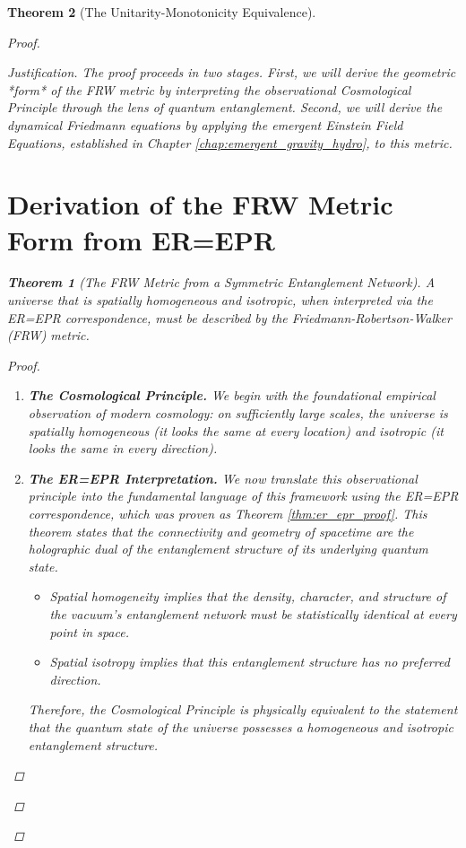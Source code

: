 \documentclass[11pt, letterpaper]{report}
\theoremstyle{plain} %
\newtheorem{theorem}{Theorem}[chapter]
\theoremstyle{definition} %
\theoremstyle{remark} %
\begin{document}
\begin{theorem}[The Unitarity-Monotonicity Equivalence]
\begin{proof}
\begin{proof}[Justification]
The proof proceeds in two stages. First, we will derive the geometric *form* of the FRW metric by interpreting the observational Cosmological Principle through the lens of quantum entanglement. Second, we will derive the dynamical Friedmann equations by applying the emergent Einstein Field Equations, established in Chapter \ref{chap:emergent_gravity_hydro}, to this metric.

\section{Derivation of the FRW Metric Form from ER=EPR}
\label{app:frw_metric_derivation}

\begin{theorem}[The FRW Metric from a Symmetric Entanglement Network]
A universe that is spatially homogeneous and isotropic, when interpreted via the ER=EPR correspondence, must be described by the Friedmann-Robertson-Walker (FRW) metric.
\end{theorem}
\begin{proof}
\begin{enumerate}
    \item \textbf{The Cosmological Principle.} We begin with the foundational empirical observation of modern cosmology: on sufficiently large scales, the universe is spatially homogeneous (it looks the same at every location) and isotropic (it looks the same in every direction).

    \item \textbf{The ER=EPR Interpretation.} We now translate this observational principle into the fundamental language of this framework using the ER=EPR correspondence, which was proven as Theorem \ref{thm:er_epr_proof}. This theorem states that the connectivity and geometry of spacetime are the holographic dual of the entanglement structure of its underlying quantum state.
    \begin{itemize}
        \item Spatial homogeneity implies that the density, character, and structure of the vacuum's entanglement network must be statistically identical at every point in space.
        \item Spatial isotropy implies that this entanglement structure has no preferred direction.
    \end{itemize}
    Therefore, the Cosmological Principle is physically equivalent to the statement that the quantum state of the universe possesses a homogeneous and isotropic entanglement structure.


\end{enumerate}
\end{proof}
\end{proof}
\end{proof}
\end{theorem}
\end{document}
